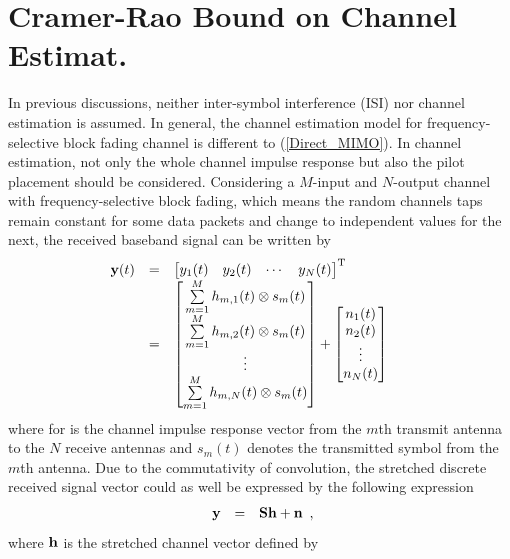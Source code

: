 \documentclass[10pt,fleqn, twocolumn]{IEEEtran}
\newcommand{\bh}{{\bf h}}
\newcommand{\bn}{{\bf n}}
\newcommand{\by}{{\bf y}}
\newcommand{\bS}{{\bf S}}
\begin{document}
\section{Cramer-Rao Bound on Channel Estimat.}
In previous discussions, neither inter-symbol interference (ISI)
nor channel estimation is assumed. In general, the channel
estimation model for frequency-selective block fading channel is
different to (\ref{Direct_MIMO}). In channel estimation, not only
the whole channel impulse response but also the pilot placement
should be considered. Considering a $M$-input and $N$-output
channel with frequency-selective block fading, which means the
random channels taps remain constant for some data packets and
change to independent values for the next, the received baseband
signal can be written by
\begin{equation}\hspace{-0.20in}
\begin{array}{rcl}
\by(t)&=&\left[\begin{matrix}y_{1}(t)&y_{2}(t)&\cdots&y_{N}(t)\end{matrix}\right]^{\rm T}\\
&=&\left[\begin{matrix}\sum\limits_{m=1}^{M}h_{m,1}(t)\otimes s_m(t)\\ \sum\limits_{m=1}^{M}h_{m,2}(t)\otimes s_m(t)\\ \vdots \\
\sum\limits_{m=1}^{M}h_{m,N}(t)\otimes
s_m(t)\end{matrix}\right]+\left[\begin{matrix}n_{1}(t)\\ n_{2}(t)\\ \vdots\\
n_{N}(t)\end{matrix}\right]
\end{array}
\end{equation}
\noindent where  for  is the channel impulse response vector from
the $m$th transmit antenna to the $N$ receive antennas and
$s_m(t)$ denotes the transmitted symbol from the $m$th antenna.
Due to the commutativity of convolution, the stretched discrete
received signal vector could as well be expressed by the following
expression
\begin{equation}%
\begin{array}{rcl}
\by&=&\bS\bh+\bn
\end{array},
\end{equation}
\noindent where $\bh$ is the stretched channel vector defined by
\end{document}
